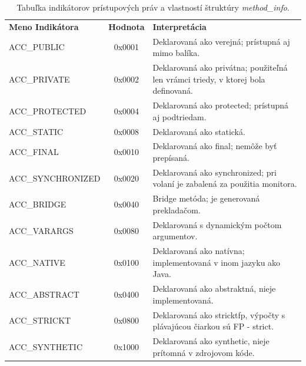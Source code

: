 \documentclass[11pt,final,oneside]{fithesis}
\begin{document}
\begin{table}
  \begin{tabular}{| l | c | p{} |}
    \hline
    \textbf{Meno Indikátora} & \textbf{Hodnota} & \textbf{Interpretácia} \\
    \hhline{|=|=|=|}
    ACC\_PUBLIC & 0x0001 & Deklarovaná ako verejná; prístupná aj mimo balíka.
    \\ \hline
    ACC\_PRIVATE & 0x0002 & Deklarovaná ako privátna; použiteľná len vrámci 
    triedy, v ktorej bola definovaná. \\ \hline
    ACC\_PROTECTED & 0x0004 & Deklarovaná ako protected; prístupná aj 
    podtriedam. \\ \hline
    ACC\_STATIC & 0x0008 & Deklarovaná ako statická. \\ \hline
    ACC\_FINAL & 0x0010 & Deklarovaná ako final; nemôže byť prepísaná.
    \\ \hline
    ACC\_SYNCHRONIZED & 0x0020 & Deklarovaná ako synchronized; pri volaní je
    zabalená za použitia monitora. \\ \hline
    ACC\_BRIDGE & 0x0040 & Bridge metóda; je generovaná prekladačom. \\ \hline
    ACC\_VARARGS & 0x0080 & Deklarovaná s dynamickým počtom argumentov.
    \\ \hline
    ACC\_NATIVE & 0x0100 & Deklarovaná ako natívna; implementovaná v inom
    jazyku ako Java. \\ \hline
    ACC\_ABSTRACT & 0x0400 & Deklarovaná ako abstraktná, nieje implementovaná.
    \\ \hline
    ACC\_STRICKT & 0x0800 & Deklarovaná ako stricktfp, výpočty s plávajúcou
    čiarkou sú FP - strict. \\ \hline
    ACC\_SYNTHETIC & 0x1000 & Deklarovaná ako synthetic, nieje prítomná v
    zdrojovom kóde. \\
    \hline
  \end{tabular}
  \caption{Tabuľka indikátorov prístupových práv a vlastností štruktúry
  \textit {method\_info}.}
  \label{tab:tab5}
\end{table}
\end{document}
